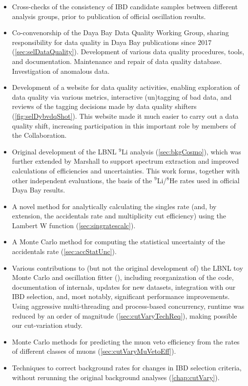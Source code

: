 \documentclass[../thesis.tex]{subfiles}
\begin{document}
\begin{itemize}
  \item Cross-checks of the consistency of IBD candidate samples between different analysis groups, prior to publication of official oscillation results.
  \item Co-convenorship of the Daya Bay Data Quality Working Group, sharing responsibility for data quality in Daya Bay publications since 2017 (\autoref{sec:selDataQuality}). Development of various data quality procedures, tools, and documentation. Maintenance and repair of data quality database. Investigation of anomalous data.
  \item Development of a website \cite{dybvdq} for data quality activities, enabling exploration of data quality via various metrics, interactive (un)tagging of bad data, and reviews of the tagging decisions made by data quality shifters (\autoref{fig:selDybvdqShot}). This website made it much easier to carry out a data quality shift, increasing participation in this important role by members of the Collaboration.
  \item Original development of the LBNL $^9$Li analysis (\autoref{sec:bkgCosmo}), which was further extended by Marshall \cite{ChrisLi9} to support spectrum extraction and improved calculations of efficiencies and uncertainties. This work forms, together with other independent evaluations, the basis of the $^9$Li/$^8$He rates used in official Daya Bay results.
  \item A novel method for analytically calculating the singles rate (and, by extension, the accidentals rate and multiplicity cut efficiency) using the Lambert W function (\autoref{sec:singratescalc}).
  \item A Monte Carlo method for computing the statistical uncertainty of the accidentals rate (\autoref{sec:accStatUnc}).
  \item Various contributions to (but not the original development of) the LBNL toy Monte Carlo and oscillation fitter (), including reorganization of the code, documentation of internals, updates for new datasets, integration with our IBD selection, and, most notably, significant performance improvements. Using aggressive multi-threading and process-based concurrency, runtime was reduced by an order of magnitude (\autoref{sec:cutVaryTechReq}), making possible our cut-variation study.
  \item Monte Carlo methods for predicting the muon veto efficiency from the rates of different classes of muons (\autoref{sec:cutVaryMuVetoEff}).
  \item Techniques to correct background rates for changes in IBD selection criteria, without rerunning the original background analyses (\autoref{chap:cutVary}).

\end{itemize}
\end{document}

